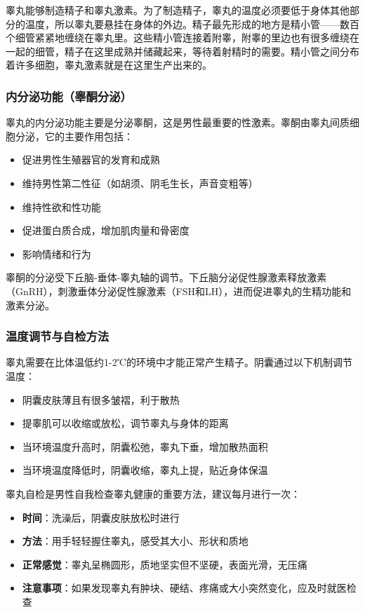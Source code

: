 睾丸能够制造精子和睾丸激素。为了制造精子，睾丸的温度必须要低于身体其他部分的温度，所以睾丸要悬挂在身体的外边。精子最先形成的地方是精小管——数百个细管紧紧地缠绕在睾丸里。这些精小管连接着附睾，附睾的里边也有很多缠绕在一起的细管，精子在这里成熟并储藏起来，等待着射精时的需要。精小管之间分布着许多细胞，睾丸激素就是在这里生产出来的。

\subsubsection{内分泌功能（睾酮分泌）}

睾丸的内分泌功能主要是分泌睾酮，这是男性最重要的性激素。睾酮由睾丸间质细胞分泌，它的主要作用包括：
\begin{itemize}
    \item 促进男性生殖器官的发育和成熟
    \item 维持男性第二性征（如胡须、阴毛生长，声音变粗等）
    \item 维持性欲和性功能
    \item 促进蛋白质合成，增加肌肉量和骨密度
    \item 影响情绪和行为
\end{itemize}

睾酮的分泌受下丘脑-垂体-睾丸轴的调节。下丘脑分泌促性腺激素释放激素（GnRH），刺激垂体分泌促性腺激素（FSH和LH），进而促进睾丸的生精功能和激素分泌。

\subsubsection{温度调节与自检方法}

睾丸需要在比体温低约1-2℃的环境中才能正常产生精子。阴囊通过以下机制调节温度：
\begin{itemize}
    \item 阴囊皮肤薄且有很多皱褶，利于散热
    \item 提睾肌可以收缩或放松，调节睾丸与身体的距离
    \item 当环境温度升高时，阴囊松弛，睾丸下垂，增加散热面积
    \item 当环境温度降低时，阴囊收缩，睾丸上提，贴近身体保温
\end{itemize}

睾丸自检是男性自我检查睾丸健康的重要方法，建议每月进行一次：
\begin{itemize}
    \item \textbf{时间}：洗澡后，阴囊皮肤放松时进行
    \item \textbf{方法}：用手轻轻握住睾丸，感受其大小、形状和质地
    \item \textbf{正常感觉}：睾丸呈椭圆形，质地坚实但不坚硬，表面光滑，无压痛
    \item \textbf{注意事项}：如果发现睾丸有肿块、硬结、疼痛或大小突然变化，应及时就医检查
\end{itemize}

